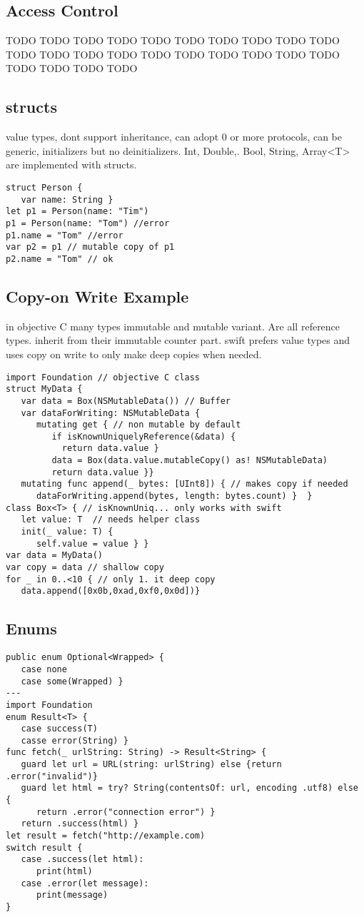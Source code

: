 \subsection{Access Control}
TODO TODO TODO TODO
TODO TODO TODO TODO
TODO TODO TODO TODO
TODO TODO TODO TODO
TODO TODO TODO TODO
TODO TODO TODO TODO

\subsection{structs}
value types, dont support inheritance, can adopt 0 or more protocols, can be generic, initializers but no deinitializers. Int, Double,. Bool, String, Array<T> are implemented with structs.
\begin{lstlisting}
struct Person {
   var name: String }
let p1 = Person(name: "Tim")
p1 = Person(name: "Tom") //error
p1.name = "Tom" //error
var p2 = p1 // mutable copy of p1
p2.name = "Tom" // ok
\end{lstlisting}

\subsection{Copy-on Write Example}
in objective C many types immutable and mutable variant. Are all reference types. inherit from their immutable counter part. swift prefers value types and uses copy on write to only make deep copies when needed.
\begin{lstlisting}
import Foundation // objective C class
struct MyData {
   var data = Box(NSMutableData()) // Buffer
   var dataForWriting: NSMutableData {
      mutating get { // non mutable by default
         if isKnownUniquelyReference(&data) {
           return data.value }
         data = Box(data.value.mutableCopy() as! NSMutableData)
         return data.value }}
   mutating func append(_ bytes: [UInt8]) { // makes copy if needed
      dataForWriting.append(bytes, length: bytes.count) }  }
class Box<T> { // isKnownUniq... only works with swift
   let value: T  // needs helper class
   init(_ value: T) {
      self.value = value } }
var data = MyData()
var copy = data // shallow copy
for _ in 0..<10 { // only 1. it deep copy
   data.append([0x0b,0xad,0xf0,0x0d])}
\end{lstlisting}

\subsection{Enums}
\begin{lstlisting}
public enum Optional<Wrapped> {
   case none
   case some(Wrapped) }
---
import Foundation
enum Result<T> {
   case success(T)
   casse error(String) }
func fetch(_ urlString: String) -> Result<String> {
   guard let url = URL(string: urlString) else {return .error("invalid")}
   guard let html = try? String(contentsOf: url, encoding .utf8) else {
      return .error("connection error") }
   return .success(html) }
let result = fetch("http://example.com)
switch result {
   case .success(let html):
      print(html)
   case .error(let message):
      print(message)
}
\end{lstlisting}

